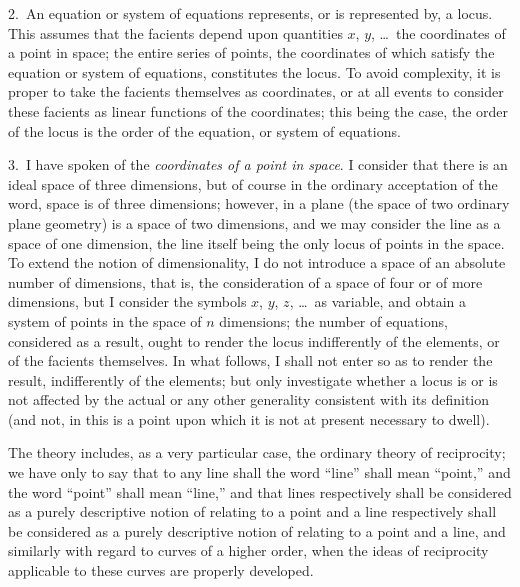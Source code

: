 \documentclass[11pt,a4paper]{article}
\begin{document}
\medskip

2.\ An equation or system of equations represents, or is represented by, a locus. This assumes that the facients depend upon quantities $x$, $y$, \ldots\ the coordinates of a point in space; the entire series of points, the coordinates of which satisfy the equation or system of equations, constitutes the locus. To avoid complexity, it is proper to take the facients themselves as coordinates, or at all events to consider these facients as linear functions of the coordinates; this being the case, the order of the locus is the order of the equation, or system of equations.

\medskip

3.\ I have spoken of the \textit{coordinates of a point in space}. I consider that there is an ideal space of three dimensions, but of course in the ordinary acceptation of the word, space is of three dimensions; however, in a plane (the space of two ordinary plane geometry) is a space of two dimensions, and we may consider the line as a space of one dimension, the line itself being the only locus of points in the space. To extend the notion of dimensionality, I do not introduce a space of an absolute number of dimensions, that is, the consideration of a space of four or of more dimensions, but I consider the symbols $x$, $y$, $z$, \ldots\ as variable, and obtain a system of points in the space of $n$ dimensions; the number of equations, considered as a result, ought to render the locus indifferently of the elements, or of the facients themselves. In what follows, I shall not enter so as to render the result, indifferently of the elements; but only investigate whether a locus is or is not affected by the actual or any other generality consistent with its definition (and not, in this is a point upon which it is not at present necessary to dwell).

\medskip

The theory includes, as a very particular case, the ordinary theory of reciprocity; we have only to say that to any line shall the word ``line'' shall mean ``point,'' and the word ``point'' shall mean ``line,'' and that lines respectively shall be considered as a purely descriptive notion of relating to a point and a line respectively shall be considered as a purely descriptive notion of relating to a point and a line, and similarly with regard to curves of a higher order, when the ideas of reciprocity applicable to these curves are properly developed.

\medskip
\end{document}
